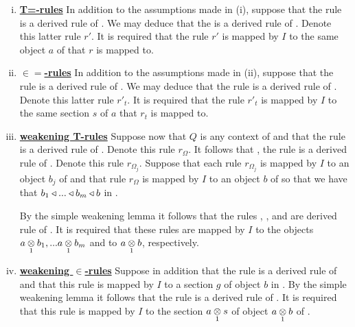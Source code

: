 \begin{definition}
\begin{enumerate}[(i)]
\item \underline{\textbf{T=-rules}} 
In addition to the assumptions made in (i), suppose that  
the rule  is a derived rule of \gatU. 
We may deduce that the
 is a derived rule of \gatU. Denote this latter rule $r'$.
It is required that the rule $r'$ is mapped by $I$ to the same object $a$ of \catcw that $r$ is mapped to.

\item \underline{\textbf{$\boldsymbol{\in=}$-rules}} 
In addition to the assumptions made in (ii),  suppose that the rule
is a derived rule of \gatU. We may deduce that the rule
 is a  derived rule of \gatU. 
Denote this latter rule $r'_t$.
It is required that the rule $r'_t$ is mapped by $I$ to the same section $s$ of $a$ that $r_t$ is mapped to.

\item \underline{\textbf{weakening T-rules}} 
Suppose now that $Q$ is any context of \gatUw and that the rule 
 is a derived rule of \gatU. Denote this rule $r_\Omega$. 
It follows that \foreachj, the rule    is a derived rule of \gatU. Denote this rule $r_{\Omega_j}$.
Suppose that each rule $r_{\Omega_j}$ is mapped by $I$ to an object $b_j$ of \catcw and that rule $r_\Omega$ is mapped by $I$ to an object $b$ of \catcw so that
we have that $b_1 \base ... \base b_m \base b$ in \catc.

By the simple weakening lemma it follows that the rules
, \foreachj, and 
 are  derived rule of \gatU. It is required that these rules are mapped by $I$ to the objects
$\crossx{a}{b_1}{1},...\crossx{a}{b_m}{1}$ and to $\crossx{a}{b}{1}$, respectively. 

\item \underline{\textbf{weakening $\boldsymbol {\in}$-rules}} 
Suppose in addition that the rule  is a derived rule of \gatUw 
and that this rule is mapped by $I$ to a section $g$ of object $b$ in \catc.
By the simple weakening lemma it follows that the rule 
is a derived rule of \gatU. It is required that this rule is mapped by $I$ to the section $\crossx{a}{s}{1}$
of object $\crossx{a}{b}{1}$ of \catc.



\end{enumerate}
\end{definition}
